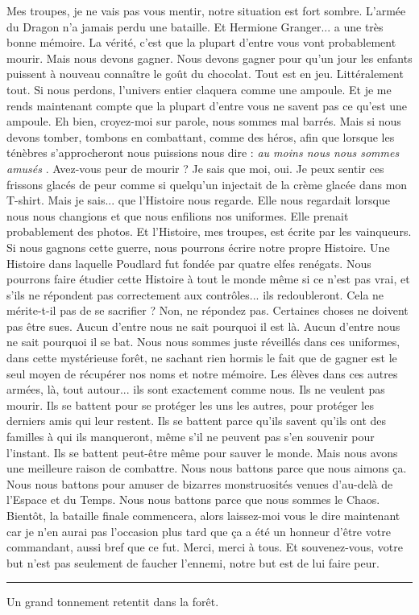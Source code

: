Mes troupes, je ne vais pas vous mentir, notre situation est fort sombre. L'armée du Dragon n'a jamais perdu une bataille. Et Hermione Granger... a une très bonne mémoire. La vérité, c'est que la plupart d'entre vous vont probablement mourir. Mais nous devons gagner. Nous devons gagner pour qu'un jour les enfants puissent à nouveau connaître le goût du chocolat. Tout est en jeu. Littéralement tout. Si nous perdons, l'univers entier claquera comme une ampoule. Et je me rends maintenant compte que la plupart d'entre vous ne savent pas ce qu'est une ampoule. Eh bien, croyez-moi sur parole, nous sommes mal barrés. Mais si nous devons tomber, tombons en combattant, comme des héros, afin que lorsque les ténèbres s'approcheront nous puissions nous dire : \emph{au moins nous nous sommes amusés} . Avez-vous peur de mourir ? Je sais que moi, oui. Je peux sentir ces frissons glacés de peur comme si quelqu'un injectait de la crème glacée dans mon T-shirt. Mais je sais... que l'Histoire nous regarde. Elle nous regardait lorsque nous nous changions et que nous enfilions nos uniformes. Elle prenait probablement des photos. Et l'Histoire, mes troupes, est écrite par les vainqueurs. Si nous gagnons cette guerre, nous pourrons écrire notre propre Histoire. Une Histoire dans laquelle Poudlard fut fondée par quatre elfes renégats. Nous pourrons faire étudier cette Histoire à tout le monde même si ce n'est pas vrai, et s'ils ne répondent pas correctement aux contrôles... ils redoubleront. Cela ne mérite-t-il pas de se sacrifier ? Non, ne répondez pas. Certaines choses ne doivent pas être sues. Aucun d'entre nous ne sait pourquoi il est là. Aucun d'entre nous ne sait pourquoi il se bat. Nous nous sommes juste réveillés dans ces uniformes, dans cette mystérieuse forêt, ne sachant rien hormis le fait que de gagner est le seul moyen de récupérer nos noms et notre mémoire. Les élèves dans ces autres armées, là, tout autour... ils sont exactement comme nous. Ils ne veulent pas mourir. Ils se battent pour se protéger les uns les autres, pour protéger les derniers amis qui leur restent. Ils se battent parce qu'ils savent qu'ils ont des familles à qui ils manqueront, même s'il ne peuvent pas s'en souvenir pour l'instant. Ils se battent peut-être même pour sauver le monde. Mais nous avons une meilleure raison de combattre. Nous nous battons parce que nous aimons ça. Nous nous battons pour amuser de bizarres monstruosités venues d'au-delà de l'Espace et du Temps. Nous nous battons parce que nous sommes le Chaos. Bientôt, la bataille finale commencera, alors laissez-moi vous le dire maintenant car je n'en aurai pas l'occasion plus tard que ça a été un honneur d'être votre commandant, aussi bref que ce fut. Merci, merci à tous. Et souvenez-vous, votre but n'est pas seulement de faucher l'ennemi, notre but est de lui faire peur.
\par\noindent\rule{\textwidth}{0.4pt}
Un grand tonnement retentit dans la forêt.

